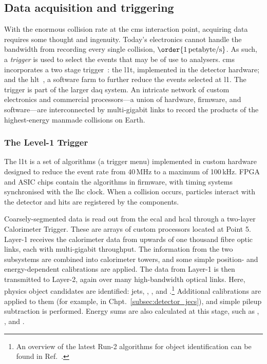 

\subsection{Data acquisition and triggering}
\label{subsec:cms_recording_data}

With the enormous collision rate at the \acrshort{cms} interaction point, acquiring data requires some thought and ingenuity. Today's electronics cannot handle the bandwidth from recording every single collision, $\order{\text{1\,petabyte/s}}$. As such, a \emph{trigger} is used to select the events that may be of use to analysers. \acrshort{cms} incorporates a two stage trigger~\cite{Bayatyan:706847}: the \acrfull{l1t}, implemented in the detector hardware; and the \acrfull{hlt}~\cite{Cittolin:578006}, a software farm to further reduce the events selected at \acrlong{l1}. The trigger is part of the larger \acrfull{daq} system. An intricate network of custom electronics and commercial processors---a union of hardware, firmware, and software---are interconnected by multi-gigabit links to record the products of the highest-energy manmade collisions on Earth.



\subsubsection{The Level-1 Trigger}
\label{subsubsec:detector_l1t}

The \acrlong{l1t} is a set of algorithms (a trigger menu) implemented in custom hardware designed to reduce the event rate from 40\,MHz to a maximum of 100\,kHz. FPGA and ASIC chips contain the algorithms in firmware, with timing systems synchronised with the \acrshort{lhc} clock. When a collision occurs, particles interact with the detector and hits are registered by the components.

Coarsely-segmented data is read out from the \acrshort{ecal} and \acrshort{hcal} through a two-layer Calorimeter Trigger. These are arrays of custom processors located at Point 5. Layer-1 receives the calorimeter data from upwards of one thousand fibre optic links, each with multi-gigabit throughput. The information from the two subsystems are combined into calorimeter towers, and some simple position- and energy-dependent calibrations are applied. The data from Layer-1 is then transmitted to Layer-2, again over many high-bandwidth optical links. Here, physics object candidates are identified: \glspl{jet}, \Pe, \Pphoton, and \Ptau.\footnote{An overview of the latest Run-2 algorithms for object identification can be found in Ref.~.} Additional calibrations are applied to them (for example, in Chpt.~\ref{subsec:detector_jecs}), and simple \gls{pileup} subtraction is performed. Energy sums are also calculated at this stage, such as \etmiss, \HT, and \mht.


